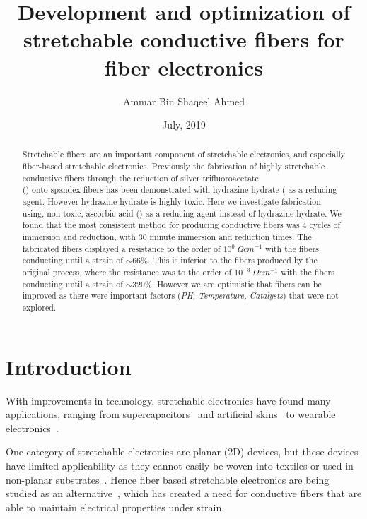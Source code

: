 \documentclass[a4paper, oneside]{discothesis}
\title{Development and optimization of stretchable conductive fibers for fiber electronics}
\author{Ammar Bin Shaqeel Ahmed}
\institute{Laboratory of Biosensors and Bioelectronics \\[2pt]
ETH Zürich}
\date{July, 2019}
\begin{document}
\frontmatter %
\maketitle

\cleardoublepage


\begin{abstract}
    Stretchable fibers are an important component of stretchable electronics, and especially fiber-based stretchable electronics. Previously the fabrication of highly stretchable conductive fibers through the reduction of silver trifluoroacetate \\() onto spandex fibers has been  demonstrated with hydrazine hydrate ( as a reducing agent. However hydrazine hydrate is highly toxic.
    Here we investigate fabrication using, non-toxic, ascorbic acid () as a reducing agent instead of hydrazine hydrate. 
    We found that the most consistent method for producing conductive fibers was 4 cycles of immersion and reduction, with 30 minute immersion and reduction times. The fabricated fibers displayed a resistance to the order of $10^0~\Omega cm^{-1}$ with the fibers conducting until a strain of $\sim66\%$. This is inferior to the fibers produced by the original process, where the resistance was to the order of $10^{-3}~\Omega cm^{-1}$ with the fibers conducting until a strain of $\sim320\%$. However we are optimistic that fibers can be improved as there were important factors (\textit{PH, Temperature, Catalysts}) that were not explored.
    
    
\end{abstract}

\tableofcontents

\mainmatter %

\chapter{Introduction}
With improvements in technology, stretchable electronics have found many applications, ranging from supercapacitors~\cite{supercap1,supercap2} and artificial skins~\cite{artifical_skin} to wearable electronics~\cite{jae2015}.

One category of stretchable electronics are planar (2D) devices, but these devices have limited applicability as they cannot easily be woven into textiles or used in non-planar substrates~\cite{planar_electronics,jae2018}.
Hence fiber based stretchable electronics are being studied as an alternative~\cite{jae2015}, which has created a need for conductive fibers that are able to maintain electrical properties under strain. 
\end{document}

